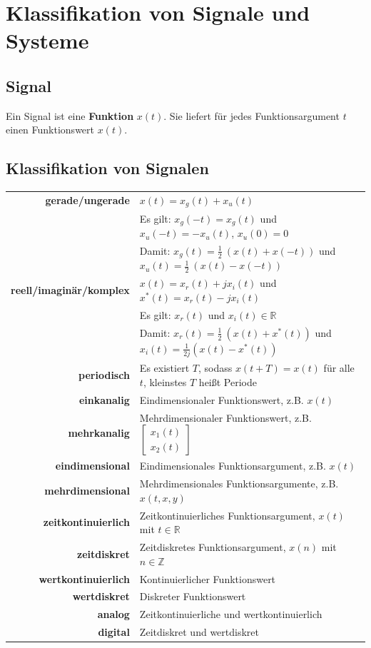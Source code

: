 \documentclass[10pt,a4paper]{article}
\author{Florian Euchner, Stefan Köbel, Chong Shen, Jan Frederik Dick}
\newcommand{\fancythumb}[2]{
	\addthumb{#1}{\large\sffamily\textbf{\space\space#1\vspace{5pt}}}{white}{#2}
}
\begin{document}
\section*{Klassifikation von Signale und Systeme}
\fancythumb{Klass.}{teal}
\subsection*{Signal}
Ein Signal ist eine \textbf{Funktion} $x(t)$. Sie liefert für jedes Funktionsargument $t$ einen Funktionswert $x(t)$.
\subsection*{Klassifikation von Signalen}
\begin{tabular}{r p{12cm}}
	\textbf{gerade/ungerade} & $x(t)=x_g(t)+x_u(t)$\\
	 & Es gilt: $x_g(-t)=x_g(t)$ und $x_u(-t)=-x_u(t)$, $x_u(0)=0$\\
	 & Damit: $x_g(t) = \frac{1}{2} ~ (x(t)+x(-t))$ und $x_u(t) = \frac{1}{2} ~ (x(t)-x(-t))$ \\
	 \textbf{reell/imaginär/komplex} & $x(t)=x_r(t)+jx_i(t)$ und $x^*(t)=x_r(t)-jx_i(t)$\\
	 & Es gilt: $x_r(t)$ und $x_i(t) \in \mathbb R$\\
	 & Damit: $x_r(t) = \frac{1}{2} ~ (x(t)+x^*(t))$ und $x_i(t)=\frac{1}{2j}(x(t)-x^*(t))$\\
	 \textbf{periodisch} & Es existiert $T$, sodass $x(t+T)=x(t)$ für alle $t$, kleinstes $T$ heißt Periode\\
	 \textbf{einkanalig} & Eindimensionaler Funktionswert, z.B. $x(t)$\\
	 \textbf{mehrkanalig} & Mehrdimensionaler Funktionswert, z.B.
	$\begin{bmatrix}
		x_1(t) \\ 
		x_2(t)
	\end{bmatrix}$\\
	\textbf{eindimensional} & Eindimensionales Funktionsargument, z.B. $x(t)$\\
	\textbf{mehrdimensional} & Mehrdimensionales Funktionsargumente, z.B. $x(t,x,y)$\\
	\textbf{zeitkontinuierlich} & Zeitkontinuierliches Funktionsargument, $x(t)$ mit $t \in \mathbb R$\\
	\textbf{zeitdiskret} & Zeitdiskretes Funktionsargument, $x(n)$ mit $n \in \mathbb Z$\\
	\textbf{wertkontinuierlich} & Kontinuierlicher Funktionswert\\
	\textbf{wertdiskret} & Diskreter Funktionswert\\
	\textbf{analog} & Zeitkontinuierliche und wertkontinuierlich\\
	\textbf{digital} & Zeitdiskret und wertdiskret\\
\end{tabular}
\end{document}
